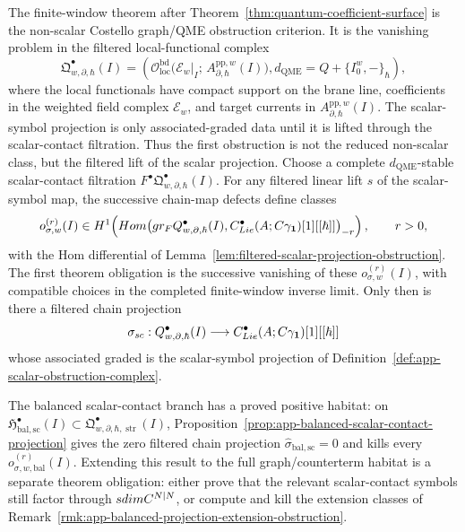 \documentclass[11pt]{memoir}
\begin{document}
\begin{prob}\label{prob:quantum-p0-operation-realization}
  The finite-window theorem after
  Theorem~\ref{thm:quantum-coefficient-surface} is the non-scalar
  Costello graph/QME obstruction criterion.  It is the vanishing problem in the
  filtered local-functional complex
  \[
    \mathfrak Q^\bullet_{w,\partial,\hbar}(I)
      =
      \left(
      \mathcal O_{\mathrm{loc}}^{\mathrm{bd}}\bigl(
        \mathcal E_w|_I;\,A^{\mathrm{pp},w}_{\partial,\hbar}(I)\bigr),
      d_{\mathrm{QME}}=Q+\{I_0^w,-\}_\hbar
      \right),
  \]
  where the local functionals have compact support on the brane line,
  coefficients in the weighted field complex \(\mathcal E_w\), and
  target currents in \(A^{\mathrm{pp},w}_{\partial,\hbar}(I)\).  The
  scalar-symbol projection is only associated-graded data until it is
  lifted through the scalar-contact filtration.  Thus the first
  obstruction is not the reduced non-scalar class, but the filtered
  lift of the scalar projection.  Choose a complete
  \(d_{\mathrm{QME}}\)-stable scalar-contact filtration
  \(F^\bullet\mathfrak Q^\bullet_{w,\partial,\hbar}(I)\).  For any
  filtered linear lift \(s\) of the scalar-symbol map, the successive
  chain-map defects define classes
  \[
    o_{\sigma,w}^{(r)}(I)\in
    H^1\!\left(
      Hom\bigl(
        gr_{F}
        Q^\bullet_{w,\partial,\hbar}(I),
        C^\bullet_{Lie}(A;C\gamma_{\mathbf 1})[1][[\hbar]]
      \bigr)_{-r}
    \right),\qquad r>0,
  \]
  with the Hom differential of
  Lemma~\ref{lem:filtered-scalar-projection-obstruction}.  The first
  theorem obligation is the successive vanishing of these
  \(o_{\sigma,w}^{(r)}(I)\), with compatible choices in the completed
  finite-window inverse limit.  Only then is there a filtered chain
  projection
  \[
    \sigma_{sc}:
    Q^\bullet_{w,\partial,\hbar}(I)
      \longrightarrow
    C^\bullet_{Lie}(A;C\gamma_{\mathbf 1})[1][[\hbar]]
  \]
  whose associated graded is the scalar-symbol projection of
  Definition~\ref{def:app-scalar-obstruction-complex}.

  The balanced scalar-contact branch has a proved positive habitat:
  on
  \(\mathfrak H^\bullet_{\mathrm{bal,sc}}(I)\subset
  \mathfrak Q^\bullet_{w,\partial,\hbar,\operatorname{str}}(I)\),
  Proposition~\ref{prop:app-balanced-scalar-contact-projection} gives
  the zero filtered chain projection
  \(\widehat\sigma_{\mathrm{bal,sc}}=0\) and kills every
  \(o_{\sigma,w,\mathrm{bal}}^{(r)}(I)\).  Extending this result to the
  full graph/counterterm habitat is a separate theorem obligation:
  either prove that the relevant scalar-contact symbols still factor
  through \(sdimC^{N|N}\), or compute and kill the
  extension classes of
  Remark~\ref{rmk:app-balanced-projection-extension-obstruction}.


\end{prob}
\end{document}
